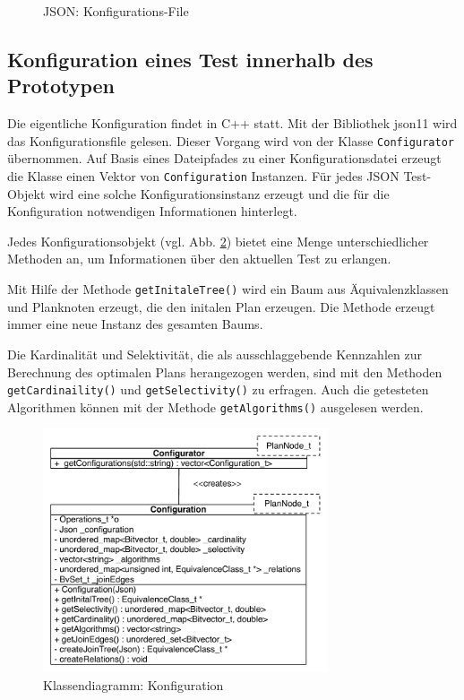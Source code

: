 \begin{figure}[ht]

\caption{JSON: Konfigurations-File}
\label{JsonConfigFile}
\end{figure}

\subsection{Konfiguration eines Test innerhalb des Prototypen}

Die eigentliche Konfiguration findet in C++ statt. Mit der Bibliothek json11 \cite{json11} wird das Konfigurationsfile gelesen. Dieser Vorgang wird von der Klasse \texttt{Config\-urator} übernommen. Auf Basis eines Dateipfades zu einer Konfigurationsdatei erzeugt die Klasse einen Vektor von \texttt{Configuration} Instanzen. Für jedes JSON Test-Objekt wird eine solche Konfigurationsinstanz erzeugt und die für die Konfiguration notwendigen Informationen hinterlegt.

Jedes Konfigurationsobjekt (vgl. Abb. \ref{Konfiguration}) bietet eine Menge unterschiedlicher Methoden an, um Informationen über den aktuellen Test zu erlangen.

Mit Hilfe der Methode \texttt{getInitaleTree()} wird ein Baum aus Äquivalenzklassen und Planknoten erzeugt, die den initalen Plan erzeugen. Die Methode erzeugt immer eine neue Instanz des gesamten Baums.

Die Kardinalität und Selektivität, die als ausschlaggebende Kennzahlen zur Berechnung des optimalen Plans herangezogen werden, sind mit den Methoden \texttt{get\-Cardinaility()} und \texttt{get\-Selectivity()} zu erfragen. Auch die getesteten Algorithmen können mit der Methode \texttt{getAlgorithms()} ausgelesen werden.


\begin{figure}[ht]
  \centering
  \includegraphics[width=0.75\textwidth]{04_Implementierung/00_media/ConfigurationClass.pdf}
  \caption{Klassendiagramm: Konfiguration}
  \label{Konfiguration}
\end{figure}
